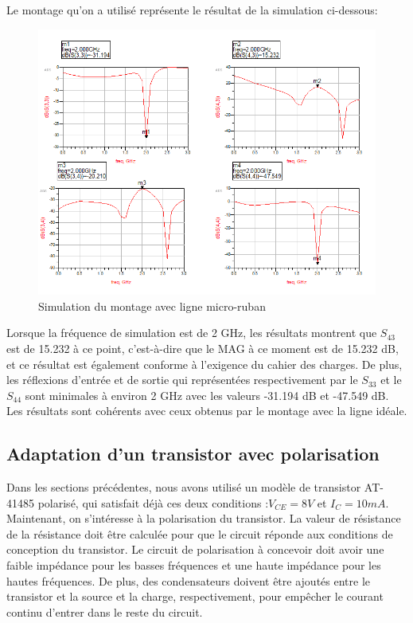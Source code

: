 \documentclass[french]{article}
\begin{document}
Le montage qu’on a utilisé représente le résultat de la simulation ci-dessous:
\begin{figure}[H]
	\centering
	\includegraphics[width=1\linewidth]{../5SynthAmp/ligne_micro_ruban_Sparametres}
	\caption{Simulation du montage avec ligne micro-ruban}
	\label{fig:ligne_micro_ruban_Sparametres}
\end{figure}

Lorsque la fréquence de simulation est de 2 GHz, les résultats montrent que $S_{43}$ est de 15.232 à ce point, c'est-à-dire que le MAG à ce moment est de 15.232 dB, et ce résultat est également conforme à l'exigence du cahier des charges. De plus, les réflexions d’entrée et de sortie qui représentées respectivement par le $S_{33}$ et le $S_{44}$ sont minimales à environ 2 GHz avec les valeurs -31.194 dB et -47.549 dB. Les résultats sont cohérents avec ceux obtenus par le montage avec la ligne idéale.

\subsection{Adaptation d’un transistor avec polarisation}
Dans les sections précédentes, nous avons utilisé un modèle de transistor AT-41485 polarisé, qui satisfait déjà ces deux conditions :$V_{CE}=8 V$ et $I_{C}=10 mA$. Maintenant, on s’intéresse à la polarisation du transistor. La valeur de résistance de la résistance doit être calculée pour que le circuit réponde aux conditions de conception du transistor. Le circuit de polarisation à concevoir doit avoir une faible impédance pour les basses fréquences et une haute impédance pour les hautes fréquences. De plus, des condensateurs doivent être ajoutés entre le transistor et la source et la charge, respectivement, pour empêcher le courant continu d'entrer dans le reste du circuit.
\end{document}

